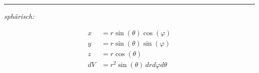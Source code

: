     \hrule
    \begin{center}
        \textit{sphärisch:}
    \end{center}\vspace{-0.25em}
    \begin{center}
        \begin{minipage}{0.49\linewidth}\vspace{-1em}
            \begin{align*}
                x &= r \sin(\theta)\cos(\varphi)\\
                y &= r \sin(\theta)\sin(\varphi)\\
                z &= r \cos(\theta)\\[0.25em]
                dV &= r^2 \sin(\theta) \, drd\varphi d\theta
            \end{align*}
        \end{minipage}
    \end{center}